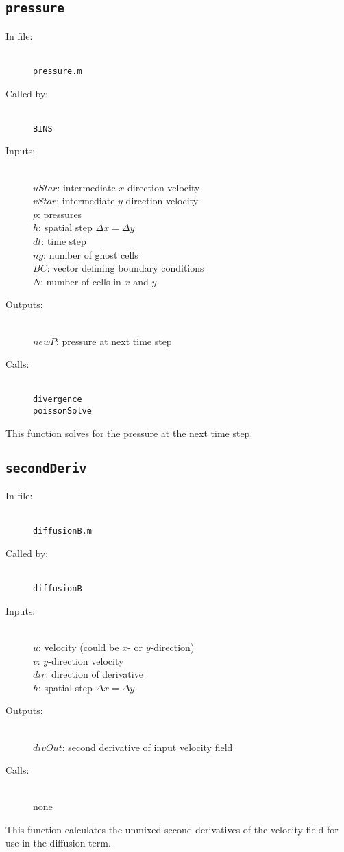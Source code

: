\documentclass[12pt]{article}
\begin{document}
\subsection{\texttt{pressure}}
\begin{description}
\item[In file:] \hfill \\ \texttt{pressure.m}
\item[Called by:] \hfill \\ \texttt{BINS}
\item[Inputs:] \hfill \\ $uStar$: intermediate $x$-direction velocity \\ $vStar$: intermediate $y$-direction velocity \\ $p$: pressures \\ $h$: spatial step $\Delta x = \Delta y$ \\ $dt$: time step \\ $ng$: number of ghost cells \\ $BC$: vector defining boundary conditions \\ $N$: number of cells in $x$ and $y$
\item[Outputs:] \hfill \\ $newP$: pressure at next time step
\item[Calls:] \hfill \\ \texttt{divergence} \\ \texttt{poissonSolve}
\end{description}
This function solves for the pressure at the next time step.

\subsection{\texttt{secondDeriv}}
\begin{description}
\item[In file:] \hfill \\ \texttt{diffusionB.m}
\item[Called by:] \hfill \\ \texttt{diffusionB}
\item[Inputs:] \hfill \\ $u$: velocity (could be $x$- or $y$-direction) \\ $v$: $y$-direction velocity \\ $dir$: direction of derivative  \\ $h$: spatial step $\Delta x = \Delta y$ 
\item[Outputs:] \hfill \\ $divOut$: second derivative of input velocity field
\item[Calls:] \hfill \\ none
\end{description}
This function calculates the unmixed second derivatives of the velocity field for use in the diffusion term.
\end{document}
